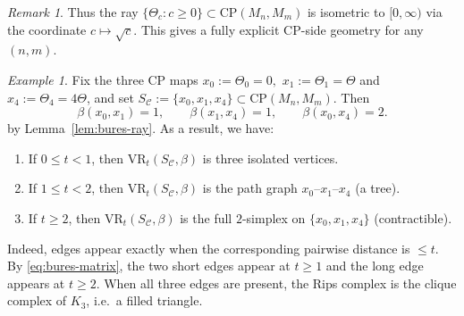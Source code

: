 \documentclass[11pt]{amsart}
\theoremstyle{definition}
\theoremstyle{remark}
\newtheorem{remark}[theorem]{Remark}
\newtheorem{example}[theorem]{Example}
\newcommand{\1}{\mathbbm{1}}
\newcommand{\CP}{\mathrm{CP}}
\newcommand{\VR}{\mathrm{VR}}
\begin{document}
\begin{remark}
Thus the ray $\{\Theta_c:c\ge 0\}\subset \CP(M_n,M_m)$ is isometric to $[0,\infty)$
via the coordinate $c\mapsto \sqrt c$. This gives a fully explicit CP-side geometry for any $(n,m)$.
\end{remark}
\begin{example}\label{ex:go1}
Fix the three CP maps $x_0:=\Theta_0=0,$ $x_1:=\Theta_1=\Theta$ and $x_4:=\Theta_4=4\Theta$,
and set $S_{\mathcal C}:=\{x_0,x_1,x_4\}\subset \CP(M_n,M_m)$. Then \begin{equation}\label{eq:bures-matrix}
\beta(x_0,x_1)=1,\qquad \beta(x_1,x_4)=1,\qquad \beta(x_0,x_4)=2.
\end{equation} by Lemma~\ref{lem:bures-ray}. As a result, we have:

\begin{enumerate}
\item[(i)] If $0\le t<1$, then  $\VR_t(S_{\mathcal C},\beta)$ is three isolated vertices.
\item[(ii)] If $1\le t<2$, then  $\VR_t(S_{\mathcal C},\beta)$ is the path graph $x_0$--$x_1$--$x_4$ (a tree).
\item[(iii)] If $t\ge 2$, then  $\VR_t(S_{\mathcal C},\beta)$ is the full $2$-simplex on $\{x_0,x_1,x_4\}$ (contractible).
\end{enumerate}

Indeed, edges appear exactly when the corresponding pairwise distance is $\le t$.
By \eqref{eq:bures-matrix}, the two short edges appear at $t\ge 1$ and the long edge appears at $t\ge 2$.
When all three edges are present, the Rips complex is the clique complex of $K_3$, i.e.\ a filled triangle.
\end{example}

\usetikzlibrary{positioning}
\end{document}
